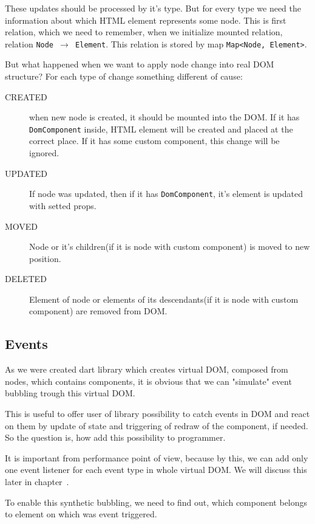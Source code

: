 \documentclass[oneside, 12pt]{book}
\begin{document}
        These updates should be processed by it's type. 
        But for every type we need the information about which HTML element represents some node. 
        This is first relation, which we need to remember, when we initialize mounted relation, 
        relation \mbox{\texttt{Node $\rightarrow$ Element}}. 
        This relation is stored by map \texttt{Map<Node, Element>}.

        But what happened when we want to apply node change into real DOM structure?
        For each type of change something different of cause:
        \begin{description}
          \item[CREATED]
            when new node is created, it should be mounted into the DOM. 
            If it has \texttt{DomComponent} inside, HTML element will be created and placed at the correct place. 
            If it has some custom component, this change will be ignored. 
          \item[UPDATED]
            If node was updated, then if it has \texttt{DomComponent}, it's element is updated with setted props.
          \item[MOVED]
            Node or it's children(if it is node with custom component) is moved to new position.
          \item[DELETED]
            Element of node or elements of its descendants(if it is node with custom component) are removed from DOM.
        \end{description}

  \subsection{Events}\label{subsec:our-architecture-events}
    As we were created dart library which creates virtual DOM, composed from nodes, which contains components, 
    it is obvious that we can "simulate" event bubbling trough this virtual DOM. 

    This is useful to offer user of library possibility to catch events in DOM and react on them by update of state 
    and triggering of redraw of the component, if needed. So the question is, how add this possibility to programmer.

    It is important from performance point of view, because by this, we can add only one event listener for each event type in whole virtual DOM.
    We will discuss this later in chapter~.

    To enable this synthetic bubbling, we need to find out, which component belongs to element on which was event triggered.
\end{document}
